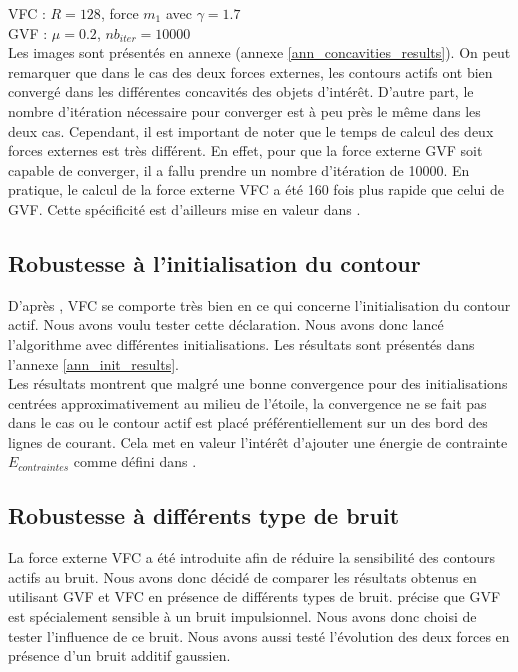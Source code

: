 VFC : $R = 128$, force $m_{1}$ avec $\gamma = 1.7$\\
GVF : $\mu = 0.2$, $nb_{iter} = 10000$\\

Les images sont présentés en annexe (annexe  \ref{ann_concavities_results}). On peut remarquer que dans le cas des deux forces externes, les contours actifs ont bien convergé dans les différentes concavités des objets d'intérêt. D'autre part, le nombre d'itération nécessaire pour converger est à peu près le même dans les deux cas. Cependant, il est important de noter que le temps de calcul des deux forces externes est très différent. En effet, pour que la force externe GVF soit capable de converger, il a fallu prendre un nombre d'itération de 10000. En pratique, le calcul de la force externe VFC a été 160 fois plus rapide que celui de GVF. Cette spécificité est d'ailleurs mise en valeur dans \cite{vfc}. 

\subsection{Robustesse à l'initialisation du contour}
D'après \cite{vfc}, VFC se comporte très bien en ce qui concerne l'initialisation du contour actif. Nous avons voulu tester cette déclaration. Nous avons donc lancé l'algorithme avec différentes initialisations. Les résultats sont présentés dans l'annexe \ref{ann_init_results}.\\ 

Les résultats montrent que malgré une bonne convergence pour des initialisations centrées approximativement au milieu de l'étoile, la convergence ne se fait pas dans le cas ou le contour actif est placé préférentiellement sur un des bord des lignes de courant. Cela met en valeur l'intérêt d'ajouter une énergie de contrainte $E_{contraintes}$ comme défini dans \cite{kaas}. 


\subsection{Robustesse à différents type de bruit}
La force externe VFC a été introduite afin de réduire la sensibilité des contours actifs au bruit. Nous avons donc décidé de comparer les résultats obtenus en utilisant GVF et VFC en présence de différents types de bruit. \cite{vfc} précise que GVF est spécialement sensible à un bruit impulsionnel. Nous avons donc choisi de tester l'influence de ce bruit. Nous avons aussi testé l'évolution des deux forces en présence d'un bruit additif gaussien. 

